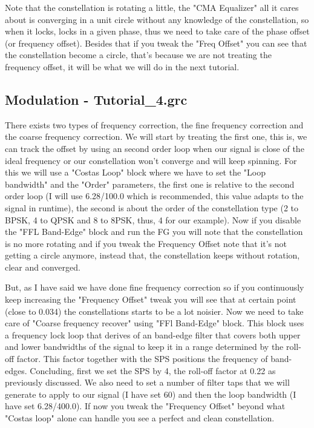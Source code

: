 \documentclass[a4paper, 10pt, conference]{ieeeconf}      %
\begin{document}
    Note that the constellation is rotating a little, the "CMA Equalizer" all it cares about is converging in a unit circle without any knowledge of the constellation, so when it locks, locks in a given phase, thus we need to take care of the phase offset (or frequency offset). Besides that if you tweak the "Freq Offset" you can see that the constellation become a circle, that's because we are not treating the frequency offset, it will be what we will do in the next tutorial.
    
\subsection{Modulation - Tutorial\_4.grc}
    There exists two types of frequency correction, the fine frequency correction and the coarse frequency correction. We will start by treating the first one, this is, we can track the offset by using an second order loop when our signal is close of the ideal frequency or our constellation won't converge and will keep spinning. For this we will use a "Costas Loop" block where we have to set the "Loop bandwidth" and the "Order" parameters, the first one is relative to the second order loop (I will use 6.28/100.0 which is recommended, this value adapts to the signal in runtime), the second is about the order of the constellation type (2 to BPSK, 4 to QPSK and 8 to 8PSK, thus, 4 for our example). Now if you disable the "FFL Band-Edge" block and run the FG you will note that the constellation is no more rotating and if you tweak the Frequency Offset note that it's not getting a circle anymore, instead that, the constellation keeps without rotation, clear and converged. 
    
    But, as I have said we have done fine frequency correction so if you continuously keep increasing the "Frequency Offset" tweak you will see that at certain point (close to 0.034) the constellations starts to be a lot noisier. Now we need to take care of "Coarse frequency recover" using "FFl Band-Edge" block. This block uses a frequency lock loop that derives of an band-edge filter that covers both upper and lower bandwidths of the signal to keep it in a range determined by the roll-off factor. This factor together with the SPS positions the frequency of band-edges.
    Concluding, first we set the SPS by 4, the roll-off factor at 0.22 as previously discussed. We also need to set a number of filter taps that we will generate to apply to our signal (I have set 60) and then the loop bandwidth (I have set 6.28/400.0). If now you tweak the "Frequency Offset" beyond what "Costas loop" alone can handle you see a perfect and clean constellation. 
\end{document}
